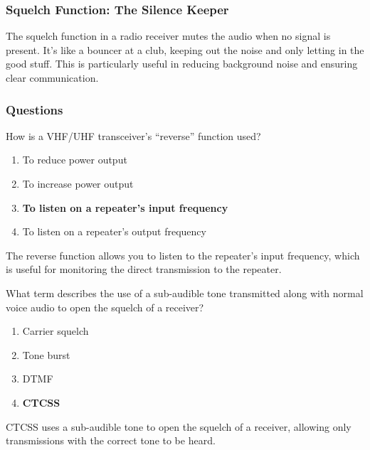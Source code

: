 \subsubsection*{Squelch Function: The Silence Keeper}
The squelch function in a radio receiver mutes the audio when no signal is present. It's like a bouncer at a club, keeping out the noise and only letting in the good stuff. This is particularly useful in reducing background noise and ensuring clear communication.

\subsubsection*{Questions}

\begin{tcolorbox}[colback=gray!10!white,colframe=black!75!black,title={T2B01}]
    How is a VHF/UHF transceiver’s “reverse” function used?
    \begin{enumerate}[label=\Alph*),noitemsep]
        \item To reduce power output
        \item To increase power output
        \item \textbf{To listen on a repeater’s input frequency}
        \item To listen on a repeater’s output frequency
    \end{enumerate}
\end{tcolorbox}

The reverse function allows you to listen to the repeater's input frequency, which is useful for monitoring the direct transmission to the repeater.

\begin{tcolorbox}[colback=gray!10!white,colframe=black!75!black,title={T2B02}]
    What term describes the use of a sub-audible tone transmitted along with normal voice audio to open the squelch of a receiver?
    \begin{enumerate}[label=\Alph*),noitemsep]
        \item Carrier squelch
        \item Tone burst
        \item DTMF
        \item \textbf{CTCSS}
    \end{enumerate}
\end{tcolorbox}

CTCSS uses a sub-audible tone to open the squelch of a receiver, allowing only transmissions with the correct tone to be heard.

